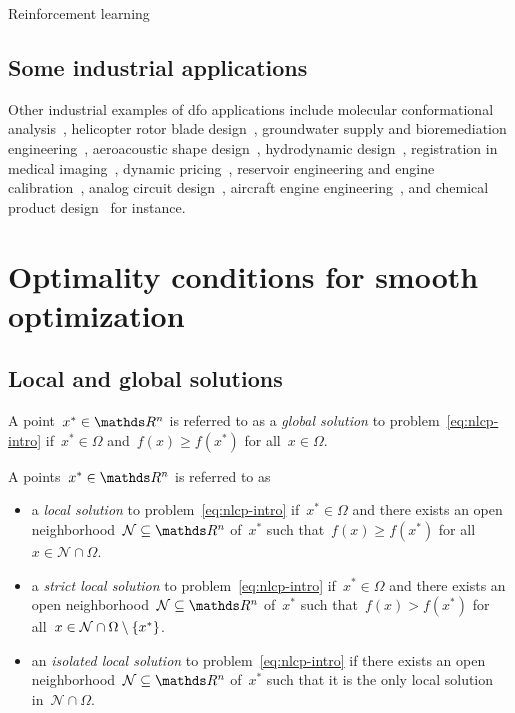 Reinforcement learning~\cite{Qian_Yu_2021}

\subsection{Some industrial applications}

Other industrial examples of \gls{dfo} applications include molecular conformational analysis~\cite{Alberto_Etal_2004,Meza_Martinez_1994}, helicopter rotor blade design~\cite{Booker_Etal_1998a,Booker_Etal_1998b,Serafini_1998}, groundwater supply and bioremediation engineering~\cite{Fowler_Etal_2008,Mugunthan_Shoemaker_Regis_2005,Yoon_Shoemaker_1999}, aeroacoustic shape design~\cite{Marsden_2004,Marsden_Etal_2004}, hydrodynamic design~\cite{Duvigneau_Visonneau_2004}, registration in medical imaging~\cite{Oeuvray_2005,Oeuvray_Bierlaire_2007}, dynamic pricing~\cite{Levina_Etal_2009}, reservoir engineering and engine calibration~\cite{Langouet_2011}, analog circuit design~\cite{Latorre_Etal_2019}, aircraft engine engineering~\cite{Gazaix_Etal_2019}, and chemical product design~\cite{Sun_Etal_2020} for instance.

\section{Optimality conditions for smooth optimization}

\subsection{Local and global solutions}

\begin{definition}
    A point~$x^{\ast} \in \R^n$ is referred to as a \emph{global solution} to problem~\cref{eq:nlcp-intro} if~$x^{\ast} \in \Omega$ and~$f(x) \ge f(x^{\ast})$ for all~$x \in \Omega$.
\end{definition}

\begin{definition}
    A points~$x^{\ast} \in \R^n$ is referred to as
    \begin{itemize}
        \item a \emph{local solution} to problem~\cref{eq:nlcp-intro} if~$x^{\ast} \in \Omega$ and there exists an open neighborhood~$\mathcal{N} \subseteq \R^n$ of~$x^{\ast}$ such that~$f(x) \ge f(x^{\ast})$ for all~$x \in \mathcal{N} \cap \Omega$.
        \item a \emph{strict local solution} to problem~\cref{eq:nlcp-intro} if~$x^{\ast} \in \Omega$ and there exists an open neighborhood~$\mathcal{N} \subseteq \R^n$ of~$x^{\ast}$ such that~$f(x) > f(x^{\ast})$ for all~$x \in \mathcal{N} \cap \Omega \setminus \{x^{\ast}\}$.
        \item an \emph{isolated local solution} to problem~\cref{eq:nlcp-intro} if there exists an open neighborhood~$\mathcal{N} \subseteq \R^n$ of~$x^{\ast}$ such that it is the only local solution in~$\mathcal{N} \cap \Omega$.
    \end{itemize}
\end{definition}


